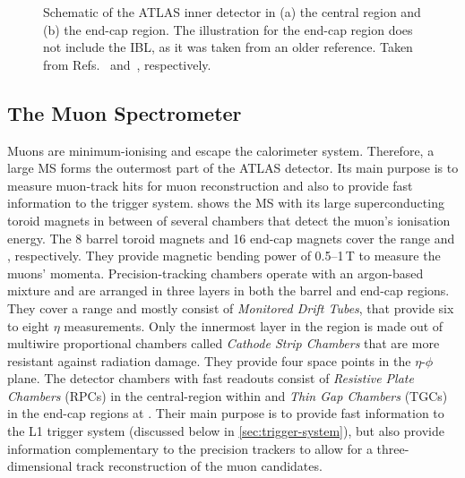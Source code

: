 \begin{figure}
    \caption{Schematic of the ATLAS inner detector in (a) the central region and (b) the end-cap region. The illustration for the end-cap region does not include the IBL, as it was taken from an older reference. Taken from Refs.~\cite{ATL-PHYS-PUB-2015-009} and~\cite{PERF-2007-01}, respectively.}
    \label{fig:ATLASinnerdetector}
\end{figure}


\subsection{The Muon Spectrometer}
Muons are minimum-ionising and escape the calorimeter system. 
Therefore, a large MS forms the outermost part of the ATLAS detector. 
Its main purpose is to measure muon-track hits for muon reconstruction and also to provide fast information to the trigger system.
 shows the MS with its large superconducting toroid magnets in between of several chambers that detect the muon's ionisation energy.
The 8 barrel toroid magnets and 16 end-cap magnets cover the range  and , respectively. They provide magnetic bending power of \numrange{0.5}{1}\,T to measure the muons' momenta. Precision-tracking chambers operate with an argon-based mixture and are arranged in three layers in both the barrel and end-cap regions. They cover a range  and mostly consist of \emph{Monitored Drift Tubes}, that provide six to eight $\eta$ measurements. Only the innermost layer in the region  is made out of multiwire proportional chambers called \emph{Cathode Strip Chambers} that are more resistant against radiation damage. They provide four space points in the $\eta$-$\phi$ plane. The detector chambers with fast readouts consist of \emph{Resistive Plate Chambers} (RPCs) in the central-region within  and \emph{Thin Gap Chambers} (TGCs) in the end-cap regions at . 
Their main purpose is to provide fast information to the L1 trigger system (discussed below in \cref{sec:trigger-system}), but also provide information complementary to the precision trackers to allow for a three-dimensional track reconstruction of the muon candidates.

